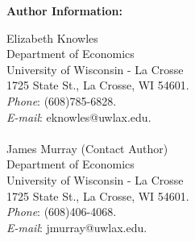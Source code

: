 \documentclass[12pt]{article}
\begin{document}
\newpage
\nocite{*}
\begin{singlespace}


\end{singlespace}

\newpage
\vspace*{0.5in}
\noindent \Large{\textbf{Author Information:}}
\vspace*{1in}

\noindent Elizabeth Knowles\\
Department of Economics\\
University of Wisconsin - La Crosse\\
1725 State St., La Crosse, WI  54601.\\
\textit{Phone}: (608)785-6828.\\
\textit{E-mail}: eknowles@uwlax.edu.\\\\


\noindent James Murray (Contact Author)\\
Department of Economics\\
University of Wisconsin - La Crosse\\
1725 State St., La Crosse, WI  54601.\\
\textit{Phone}: (608)406-4068.\\
\textit{E-mail}: jmurray@uwlax.edu.
\end{document}
